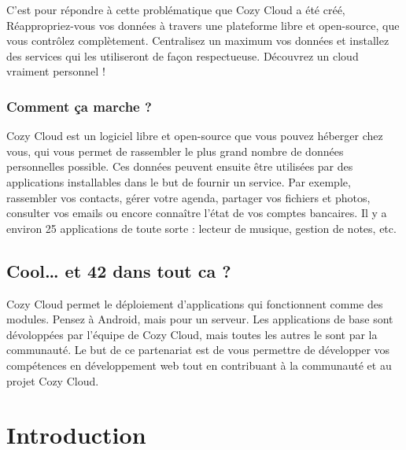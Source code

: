 \documentclass{42-fr}
\begin{document}
		C'est pour r\'epondre \`a cette probl\'ematique que Cozy Cloud a \'et\'e  cr\'e\'e,
		R\'eappropriez-vous vos donn\'ees \`a travers une plateforme libre et open-source,
		que vous contr\^olez compl\`etement. Centralisez un maximum vos donn\'ees et
		installez des services qui les utiliseront de façon respectueuse. D\'ecouvrez
		un cloud vraiment personnel !

		\subsection{Comment ça marche ?}

			Cozy Cloud est un logiciel libre et open-source que vous pouvez h\'eberger chez vous,
			qui vous permet de rassembler le plus grand nombre de donn\'ees
			personnelles possible. Ces donn\'ees peuvent ensuite \^etre utilis\'ees par des
			applications installables dans le but de fournir un service. Par exemple,
			rassembler vos contacts, g\'erer votre agenda, partager vos fichiers et
			photos, consulter vos emails ou encore conna\^itre l'\'etat de vos comptes
			bancaires. Il y a environ 25 applications de toute sorte : lecteur de musique,
			gestion de notes, etc.

	\section{Cool… et 42 dans tout ca ?}

		Cozy Cloud permet le d\'eploiement d'applications qui fonctionnent comme
		des modules. Pensez \`a Android, mais pour un serveur. Les applications de
		base sont d\'evolopp\'ees par l'\'equipe de Cozy Cloud, mais toutes
		les autres le sont par la communaut\'e. Le but de ce partenariat est de vous
		permettre de d\'evelopper vos comp\'etences en d\'eveloppement web tout
		en contribuant \`a la communaut\'e et au projet Cozy Cloud.


\chapter{Introduction}
\end{document}
